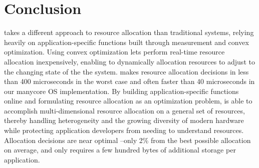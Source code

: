 \section{Conclusion}\label{conclusion}

\pacora takes a different approach to resource allocation than traditional systems, relying heavily on application-specific functions built through measurement and convex optimization.  Using convex optimization lets \pacora perform real-time resource allocation inexpensively, enabling \pacora to dynamically allocation resources to adjust to the changing state of the the system.  \pacora makes resource allocation decisions in less than 400 microseconds in the worst case and often faster than 40 microseconds in our manycore OS implementation. By building application-specific functions online and formulating resource allocation as an optimization problem, \pacora is able to accomplish multi-dimensional resource allocation on a general set of resources, thereby handling heterogeneity and the growing diversity of modern hardware while protecting application developers from needing to understand resources. Allocation decisions are near optimal --only 2\% from the best possible allocation on average, and \pacora only requires a few hundred bytes of additional storage per application. 






